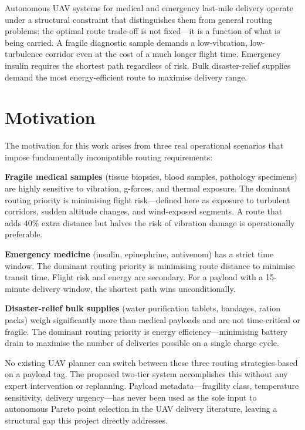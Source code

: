 \documentclass{ssnreview}
\begin{document}
Autonomous UAV systems for medical and emergency last-mile delivery operate under a
structural constraint that distinguishes them from general routing problems: the optimal
route trade-off is not fixed---it is a function of what is being carried. A fragile
diagnostic sample demands a low-vibration, low-turbulence corridor even at the cost of a
much longer flight time. Emergency insulin requires the shortest path regardless of risk.
Bulk disaster-relief supplies demand the most energy-efficient route to maximise delivery
range.

\section{Motivation}

The motivation for this work arises from three real operational scenarios that impose
fundamentally incompatible routing requirements:

\textbf{Fragile medical samples} (tissue biopsies, blood samples, pathology specimens)
are highly sensitive to vibration, g-forces, and thermal exposure. The dominant routing
priority is minimising flight risk---defined here as exposure to turbulent corridors,
sudden altitude changes, and wind-exposed segments. A route that adds 40\% extra
distance but halves the risk of vibration damage is operationally preferable.

\textbf{Emergency medicine} (insulin, epinephrine, antivenom) has a strict time window.
The dominant routing priority is minimising route distance to minimise transit time.
Flight risk and energy are secondary. For a payload with a 15-minute delivery window,
the shortest path wins unconditionally.

\textbf{Disaster-relief bulk supplies} (water purification tablets, bandages, ration
packs) weigh significantly more than medical payloads and are not time-critical or
fragile. The dominant routing priority is energy efficiency---minimising battery drain to
maximise the number of deliveries possible on a single charge cycle.

No existing UAV planner can switch between these three routing strategies based on a
payload tag. The proposed two-tier system accomplishes this without any expert
intervention or replanning. Payload metadata---fragility class, temperature sensitivity,
delivery urgency---has never been used as the sole input to autonomous Pareto point
selection in the UAV delivery literature, leaving a structural gap this project directly
addresses.
\end{document}
